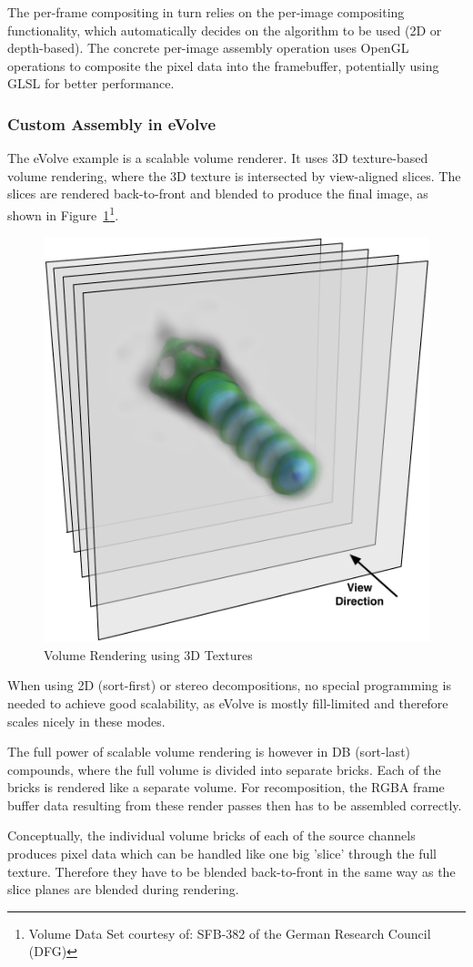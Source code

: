 \documentclass[10pt,a4]{scrartcl}
\newcommand{\fig}[1]{Figure~\ref{#1}}
\begin{document}
The per-frame compositing in turn relies on the per-image compositing
functionality, which automatically decides on the algorithm to be used
(2D or depth-based). The concrete per-image assembly operation uses
OpenGL operations to composite the pixel data into the framebuffer,
potentially using GLSL for better performance.


\subsubsection{Custom Assembly in eVolve}

The \textsf{eVolve} example is a scalable volume renderer. It uses 3D
texture-based volume rendering, where the 3D texture is intersected by
view-aligned slices. The slices are rendered back-to-front and blended
to produce the final image, as shown in \fig{fSlices}\footnote{Volume
  Data Set courtesy of: SFB-382 of the German Research Council (DFG)}.

\begin{figure}
  \includegraphics[width=.382\textwidth]{images/slices.pdf}
  {\caption{\label{fSlices}Volume Rendering using 3D Textures}}
\end{figure}
When using 2D (sort-first) or stereo decompositions, no special
programming is needed to achieve good scalability, as \textsf{eVolve} is
mostly fill-limited and therefore scales nicely in these modes. 

The full power of scalable volume rendering is however in DB (sort-last)
compounds, where the full volume is divided into separate bricks. Each
of the bricks is rendered like a separate volume. For recomposition, the
\textsf{RGBA} frame buffer data resulting from these render passes then
has to be assembled correctly. 

Conceptually, the individual volume bricks of each of the source
channels produces pixel data which can be handled like one big 'slice'
through the full texture. Therefore they have to be blen\-ded
back-to-front in the same way as the slice planes are blended during
rendering.
\end{document}
